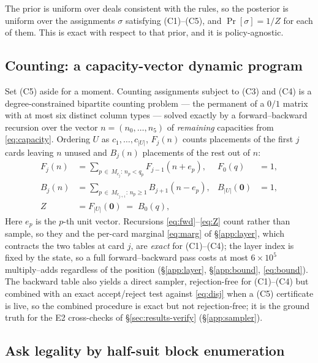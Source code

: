 The prior is uniform over deals consistent with the rules, so the posterior is
uniform over the assignments $\sigma$ satisfying (C1)--(C5), and $\Pr[\sigma]
= 1/Z$ for each of them. This is exact with respect to that prior, and it is
policy-agnostic.

\subsection{Counting: a capacity-vector dynamic program}
\label{sec:counting}

Set (C5) aside for a moment. Counting assignments subject to (C3) and (C4) is a
degree-constrained bipartite counting problem --- the permanent of a $0/1$ matrix
with at most six distinct column types --- solved exactly by a forward--backward
recursion over the vector $n = (n_0,\dots,n_5)$ of \emph{remaining} capacities
from \eqref{eq:capacity}. Ordering $U$ as $c_1,\dots,c_{|U|}$, $F_j(n)$ counts
placements of the first $j$ cards leaving $n$ unused and $B_j(n)$ placements of
the rest out of $n$:
\begin{align}
  F_j(n) &= \sum_{p \,\in\, M_{c_j} :\, n_p < q_p} F_{j-1}(n + e_p),
  &F_0(q) &= 1, \label{eq:fwd}\\
  B_j(n) &= \sum_{p \,\in\, M_{c_{j+1}} :\, n_p \ge 1} B_{j+1}(n - e_p),
  &B_{|U|}(\mathbf{0}) &= 1, \label{eq:bwd}\\
  Z &= F_{|U|}(\mathbf{0}) \;=\; B_0(q), \label{eq:Z}
\end{align}
Here $e_p$ is the $p$-th unit vector. Recursions \eqref{eq:fwd}--\eqref{eq:Z}
count rather than sample, so they and the per-card marginal \eqref{eq:marg} of
\S\ref{app:layer}, which contracts the two tables at card $j$, are
\emph{exact} for (C1)--(C4); the layer index is fixed by the state, so a full
forward--backward pass costs at most $6 \times 10^{5}$ multiply--adds
regardless of the position (\S\ref{app:layer}, \S\ref{app:bound},
\eqref{eq:bound}). The backward table also yields a direct sampler,
rejection-free for (C1)--(C4) but combined with an exact accept/reject test
against \eqref{eq:disj} when a (C5) certificate is live, so the combined
procedure is exact but not rejection-free; it is the ground truth for the E2
cross-checks of \S\ref{sec:results-verify} (\S\ref{app:sampler}).

\subsection{Ask legality by half-suit block enumeration}
\label{sec:blocks}

